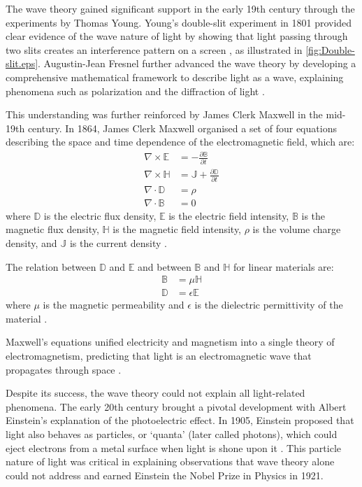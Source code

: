 The wave theory gained significant support in the early 19th century through the experiments by Thomas Young. Young's double-slit experiment in 1801 provided clear evidence of the wave nature of light by showing that light passing through two slits creates an interference pattern on a screen \cite{Young1802}, as illustrated in \cref{fig:Double-slit.eps}. Augustin-Jean Fresnel further advanced the wave theory by developing a comprehensive mathematical framework to describe light as a wave, explaining phenomena such as polarization and the diffraction of light \cite{Fresnel1826}.

This understanding was further reinforced by James Clerk Maxwell in the mid-19th century. In 1864, James Clerk Maxwell organised a set of four equations describing the space and time dependence of the electromagnetic field, which are:
\begin{align}
  \nabla \times \mathbb{E} & = -\frac{\partial \mathbb{B}}{\partial t}             \label{eq:maxwell1} \\
  \nabla \times \mathbb{H} & = \mathbb{J} + \frac{\partial \mathbb{D}}{\partial t} \label{eq:maxwell2} \\
  \nabla \cdot \mathbb{D}  & = \rho                                                \label{eq:maxwell3} \\
  \nabla \cdot \mathbb{B}  & = 0 \label{eq:maxwell4}
\end{align}
where $\mathbb{D}$ is the electric flux density, $\mathbb{E}$ is the electric field intensity, $\mathbb{B}$ is the magnetic flux density, $\mathbb{H}$ is the magnetic field intensity, $\rho$ is the volume charge density, and $\mathbb{J}$ is the current density \cite{Daintith2009}.

The relation between $\mathbb{D}$ and $\mathbb{E}$ and between $\mathbb{B}$ and $\mathbb{H}$ for linear materials are:
\begin{align}
  \mathbb{B} & = \mu \mathbb{H}      \\
  \mathbb{D} & = \epsilon \mathbb{E}
\end{align}
where $\mu$ is the magnetic permeability and $\epsilon$ is the dielectric permittivity of the material \cite{Wilkinson2017}.

Maxwell's equations unified electricity and magnetism into a single theory of electromagnetism, predicting that light is an electromagnetic wave that propagates through space \cite{Maxwell1865}.

Despite its success, the wave theory could not explain all light-related phenomena. The early 20th century brought a pivotal development with Albert Einstein's explanation of the photoelectric effect. In 1905, Einstein proposed that light also behaves as particles, or `quanta' (later called photons), which could eject electrons from a metal surface when light is shone upon it \cite{Einstein1905}. This particle nature of light was critical in explaining observations that wave theory alone could not address and earned Einstein the Nobel Prize in Physics in 1921.

